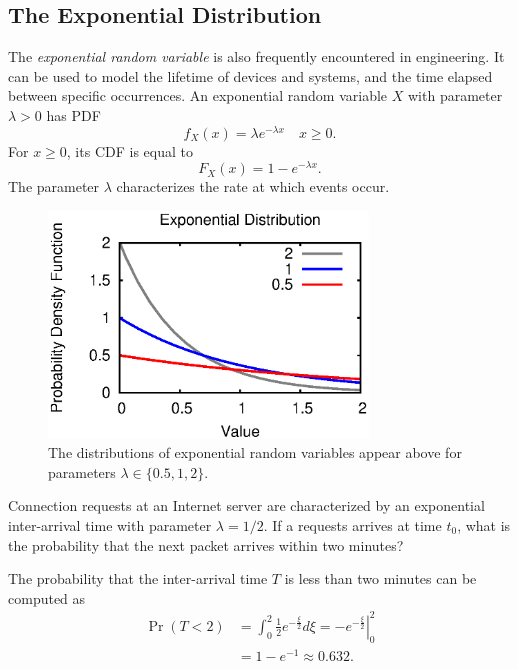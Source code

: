 \subsection{The Exponential Distribution}
\label{section:ExponentialDistribution}

The \emph{exponential random variable} is also frequently encountered in engineering. 
It can be used to model the lifetime of devices and systems, and the time elapsed between specific occurrences.
An exponential random variable $X$ with parameter $\lambda > 0$ has PDF
\begin{equation*}
f_X (x) = \lambda e^{- \lambda x} \quad x \geq 0.
\end{equation*}
For $x \geq 0$, its CDF is equal to
\begin{equation*}
F_X (x) = 1 - e^{- \lambda x} .
\end{equation*}
The parameter $\lambda$ characterizes the rate at  which events occur.

\begin{figure}[ht]
\begin{center}
\includegraphics[width=8.5cm]{Figures/8chapter/exponential_pdf}
\end{center}
\caption{The distributions of exponential random variables appear above for parameters $\lambda \in \{0.5, 1, 2 \}$.}
\end{figure}

\begin{example}
Connection requests at an Internet server are characterized by an exponential inter-arrival time with parameter $\lambda = 1/2$.
If a requests arrives at time $t_0$, what is the probability that the next packet arrives within two minutes?

The probability that the inter-arrival time $T$ is less than two minutes can be computed as
\begin{equation*}
\begin{split}
\Pr ( T < 2 ) &= \int_0^2 \frac{1}{2} e^{- \frac{\xi}{2}} d\xi
= \left. - e^{- \frac{\xi}{2}} \right|_0^2 \\
&= 1 - e^{-1} \approx 0.632 .
\end{split}
\end{equation*}
\end{example}

